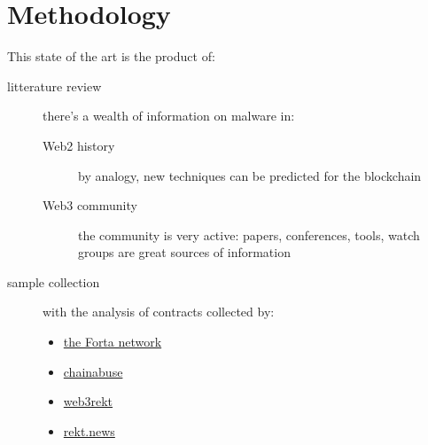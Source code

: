 \section{Methodology} \label{sec:methodology}

This state of the art is the product of:

\begin{description}
\item[litterature review]{there's a wealth of information on malware in:
    \begin{description}
    \item[Web2 history]{by analogy, new techniques can be predicted for the blockchain}
    \item[Web3 community]{the community is very active: papers, conferences, tools, watch groups are great sources of information}
    \end{description}}
\item[sample collection]{with the analysis of contracts collected by:
    \begin{itemize}
    \item{\href{https://explorer.forta.network/}{the Forta network}}
    \item{\href{https://www.chainabuse.com/reports}{chainabuse}}
    \item{\href{https://www.web3rekt.com/}{web3rekt}}
    \item{\href{https://rekt.news/}{rekt.news}}
    \end{itemize}}
\end{description}
